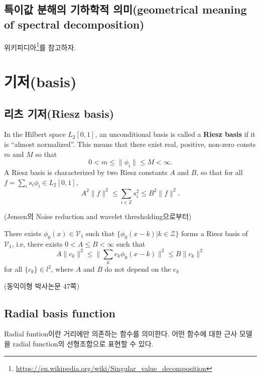 \documentclass[b5paper,]{scrbook}
\theoremstyle{plain}
\theoremstyle{definition}
\numberwithin{equation}{section}
\renewcommand{\href}[2]{#2\footnote{\url{#1}}}
\begin{document}
\hypertarget{---geometrical-meaning-of-spectral-decomposition}{%
\subsection{특이값 분해의 기하학적 의미(geometrical meaning of spectral decomposition)}\label{---geometrical-meaning-of-spectral-decomposition}}

\href{https://en.wikipedia.org/wiki/Singular_value_decomposition}{위키피디아}를 참고하자.

\hypertarget{basis}{%
\section{기저(basis)}\label{basis}}

\hypertarget{-riesz-basis}{%
\subsection{리츠 기저(Riesz basis)}\label{-riesz-basis}}

In the Hilbert space \(L_{2}[0,1]\), an unconditional basis is called a \textbf{Riesz basis} if it is ``almost normalized''. This means that there exist real, positive, non-zero consts \(m\) and \(M\) so that
\[0 < m \leq \| \phi_{i}\|\leq M < \infty.\]
A Riesz basis is characterized by two Riesz constants \(A\) and \(B\), so that for all \(f=\sum_{i}s_{i}\phi_{i}\in L_{2}[0,1]\),
\[A^{2}\| f \|^{2}\leq \sum_{i\in\mathbb{Z}}s_{i}^{2}\leq B^{2}\|f\|^{2}.\]

(Jensen의 Noise reduction and wavelet thresholding으로부터)

There exists \(\phi_{0}(x)\in\mathcal{V}_{1}\) such that \(\{ \phi_{0}(x-k) | k\in\mathcal{Z} \}\) forms a Riesz basis of \(\mathcal{V}_{1}\), i.e, there exists \(0< A \leq B <\infty\) such that
\[A \| c_{k}\|^{2} \leq \| \sum_{k}c_{k}\phi_{0}(x-k)\|^{2} \leq B \| c_{k} \|^{2}\]
for all \(\{c_{k}\}\in l^{2}\), where \(A\) and \(B\) do not depend on the \(c_{k}\)

(동익이형 박사논문 47쪽)

\hypertarget{radial-basis-function}{%
\subsection{Radial basis function}\label{radial-basis-function}}

Radial funtion이란 거리에만 의존하는 함수를 의미한다. 어떤 함수에 대한 근사 모델을 radial function의 선형조합으로 표현할 수 있다.
\end{document}
